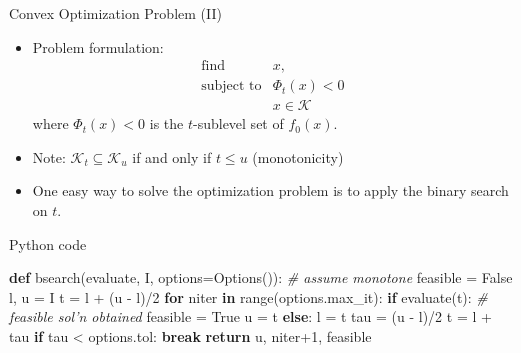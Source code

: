 \documentclass[10pt,ignorenonframetext,serif,onlymath]{beamer}
\newenvironment{Shaded}{}{}
\newcommand{\BuiltInTok}[1]{#1}
\newcommand{\CommentTok}[1]{\textcolor[rgb]{0.38,0.63,0.69}{\textit{#1}}}
\newcommand{\ControlFlowTok}[1]{\textcolor[rgb]{0.00,0.44,0.13}{\textbf{#1}}}
\newcommand{\DecValTok}[1]{\textcolor[rgb]{0.25,0.63,0.44}{#1}}
\newcommand{\KeywordTok}[1]{\textcolor[rgb]{0.00,0.44,0.13}{\textbf{#1}}}
\newcommand{\NormalTok}[1]{#1}
\newcommand{\OperatorTok}[1]{\textcolor[rgb]{0.40,0.40,0.40}{#1}}
\newcommand{\VariableTok}[1]{\textcolor[rgb]{0.10,0.09,0.49}{#1}}
\begin{document}
\begin{frame}{Convex Optimization Problem (II)}
\protect\hypertarget{sec:convex-optimization-problem-ii}{}

\begin{itemize}
\item
  Problem formulation: \[\begin{array}{ll}
              \text{find}         & x, \\
              \text{subject to}   & \Phi_t(x) < 0 \\
                                  & x \in \mathcal{K}
    \end{array}\] where \(\Phi_t(x) < 0\) is the \(t\)-sublevel set of
  \(f_0(x)\).
\item
  Note: \(\mathcal{K}_t \subseteq \mathcal{K}_u\) if and only if
  \(t \leq u\) (monotonicity)
\item
  One easy way to solve the optimization problem is to apply the binary
  search on \(t\).
\end{itemize}

\end{frame}

\begin{frame}[fragile]{Python code}
\protect\hypertarget{sec:python-code-1}{}

\begin{Shaded}
\begin{Highlighting}[]
\KeywordTok{def}\NormalTok{ bsearch(evaluate, I, options}\OperatorTok{=}\NormalTok{Options()):}
    \CommentTok{# assume monotone}
\NormalTok{    feasible }\OperatorTok{=} \VariableTok{False}
\NormalTok{    l, u }\OperatorTok{=}\NormalTok{ I}
\NormalTok{    t }\OperatorTok{=}\NormalTok{ l }\OperatorTok{+}\NormalTok{ (u }\OperatorTok{-}\NormalTok{ l)}\OperatorTok{/}\DecValTok{2}
    \ControlFlowTok{for}\NormalTok{ niter }\KeywordTok{in} \BuiltInTok{range}\NormalTok{(options.max_it):}
        \ControlFlowTok{if}\NormalTok{ evaluate(t):  }\CommentTok{# feasible sol'n obtained}
\NormalTok{            feasible }\OperatorTok{=} \VariableTok{True}
\NormalTok{            u }\OperatorTok{=}\NormalTok{ t}
        \ControlFlowTok{else}\NormalTok{:}
\NormalTok{            l }\OperatorTok{=}\NormalTok{ t}
\NormalTok{        tau }\OperatorTok{=}\NormalTok{ (u }\OperatorTok{-}\NormalTok{ l)}\OperatorTok{/}\DecValTok{2}
\NormalTok{        t }\OperatorTok{=}\NormalTok{ l }\OperatorTok{+}\NormalTok{ tau}
        \ControlFlowTok{if}\NormalTok{ tau }\OperatorTok{<}\NormalTok{ options.tol:}
            \ControlFlowTok{break}
    \ControlFlowTok{return}\NormalTok{ u, niter}\OperatorTok{+}\DecValTok{1}\NormalTok{, feasible}
\end{Highlighting}
\end{Shaded}

\end{frame}
\end{document}
